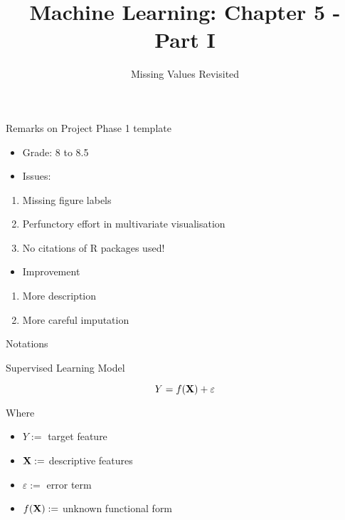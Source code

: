 \documentclass[ignorenonframetext,]{beamer}
\title{Machine Learning: Chapter 5 - Part I}
\subtitle{Missing Values Revisited}
\date{}
\providecommand{\tightlist}{%
  \setlength{\itemsep}{0pt}\setlength{\parskip}{0pt}}
\begin{document}
\frame{\titlepage}

\begin{frame}{Remarks on Project Phase 1 template}

\begin{itemize}[<+->]
\tightlist
\item
  Grade: 8 to 8.5
\item
  Issues:
\end{itemize}

\begin{enumerate}[<+->]
\def\labelenumi{\arabic{enumi}.}
\tightlist
\item
  Missing figure labels
\item
  Perfunctory effort in multivariate visualisation
\item
  No citations of R packages used!
\end{enumerate}

\begin{itemize}[<+->]
\tightlist
\item
  Improvement
\end{itemize}

\begin{enumerate}[<+->]
\def\labelenumi{\arabic{enumi}.}
\tightlist
\item
  More description
\item
  More careful imputation
\end{enumerate}

\end{frame}

\begin{frame}{Notations}

Supervised Learning Model

\[Y = f(\bold{X}) + \varepsilon\]

Where

\begin{itemize}[<+->]
\tightlist
\item
  \(Y:=\) target feature
\item
  \(\bold{X}:=\) descriptive features
\item
  \(\varepsilon:=\) error term
\item
  \(f(\bold{X}):=\) unknown functional form
\end{itemize}

\end{frame}
\end{document}

